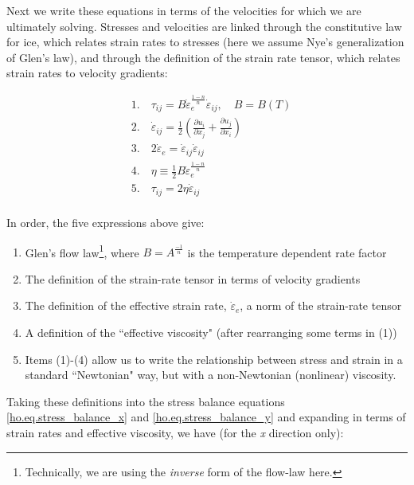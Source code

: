 Next we write these equations in terms of the velocities for which we are ultimately solving. Stresses and velocities are linked through the 
constitutive law for ice, which relates strain rates to stresses (here we assume Nye's generalization of Glen's law), and through the 
definition of the strain rate tensor, which relates strain rates to velocity gradients:

\begin{equation}
  \begin{split}
    & 1.\quad \tau _{ij}=B\dot{\varepsilon }_{e}^{\frac{1-n}{n}}\dot{\varepsilon }_{ij},\quad B=B(T) \\ 
    & 2.\quad \dot{\varepsilon }_{ij}=\frac{1}{2}\left( \frac{\partial u_{i}}{\partial x_{j}}+\frac{\partial u_{j}}{\partial x_{i}} \right) \\ 
    & 3.\quad 2\dot{\varepsilon }_{e}=\dot{\varepsilon }_{ij}\dot{\varepsilon }_{ij} \\ 
    & 4.\quad \eta \equiv \frac{1}{2}B\dot{\varepsilon }_{e}^{\frac{1-n}{n}} \\ 
    & 5.\quad \tau _{ij}=2\eta \dot{\varepsilon }_{ij} \\ 
  \end{split}
\end{equation}

\noindent
In order, the five expressions above give: 

\begin{enumerate}
\item  Glen's flow law\footnote{Technically, we are using the \textit{inverse} form of the flow-law here.}, where 
$B = A^{\frac{-1}{n}}$ is the temperature dependent rate factor 
\item  The definition of the strain-rate tensor in terms of velocity gradients
\item  The definition of the effective strain rate, $\dot{\varepsilon }_{e}$, a norm of the strain-rate tensor
\item  A definition of the ``effective viscosity" (after rearranging some terms in (1))
\item  Items (1)-(4) allow us to write the relationship between stress and strain in a standard ``Newtonian" way, but with a non-Newtonian (nonlinear) viscosity.
\end{enumerate}

\noindent
Taking these definitions into the stress balance equations \eqref{ho.eq.stress_balance_x} and \eqref{ho.eq.stress_balance_y} 
and expanding in terms of strain rates and effective viscosity, we have (for the \textit{x} direction only):

